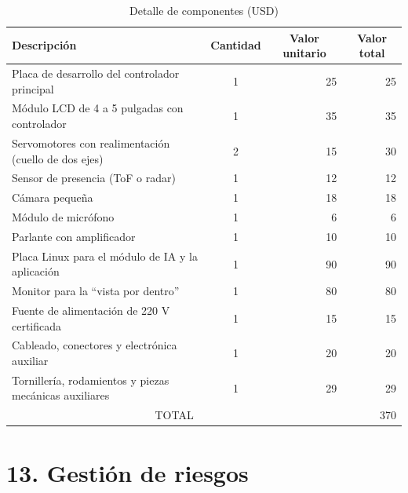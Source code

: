 \documentclass[
11pt, %
]{charter}
\begin{document}
\begin{table}[htpb]
\centering
\caption{Detalle de componentes (USD)}
\label{tab:componentes}
\begin{tabularx}{\linewidth}{@{}|X|c|r|r|@{}}
\hline
\rowcolor[HTML]{C0C0C0}
Descripción &
  \multicolumn{1}{c|}{\cellcolor[HTML]{C0C0C0}Cantidad} &
  \multicolumn{1}{c|}{\cellcolor[HTML]{C0C0C0}Valor unitario} &
  \multicolumn{1}{c|}{\cellcolor[HTML]{C0C0C0}Valor total} \\ \hline
Placa de desarrollo del controlador principal & 1 & 25 & 25 \\ \hline
Módulo LCD de 4 a 5 pulgadas con controlador & 1 & 35 & 35 \\ \hline
Servomotores con realimentación (cuello de dos ejes) & 2 & 15 & 30 \\ \hline
Sensor de presencia (ToF o radar) & 1 & 12 & 12 \\ \hline
Cámara pequeña & 1 & 18 & 18 \\ \hline
Módulo de micrófono & 1 & 6 & 6 \\ \hline
Parlante con amplificador & 1 & 10 & 10 \\ \hline
Placa Linux para el módulo de IA y la aplicación & 1 & 90 & 90 \\ \hline
Monitor para la ``vista por dentro'' & 1 & 80 & 80 \\ \hline
Fuente de alimentación de 220 V certificada & 1 & 15 & 15 \\ \hline
Cableado, conectores y electrónica auxiliar & 1 & 20 & 20 \\ \hline
Tornillería, rodamientos y piezas mecánicas auxiliares & 1 & 29 & 29 \\ \hline
\multicolumn{3}{|c|}{TOTAL} & 370 \\ \hline
\end{tabularx}%
\end{table}


\section{13. Gestión de riesgos}
\label{sec:riesgos}
\end{document}
